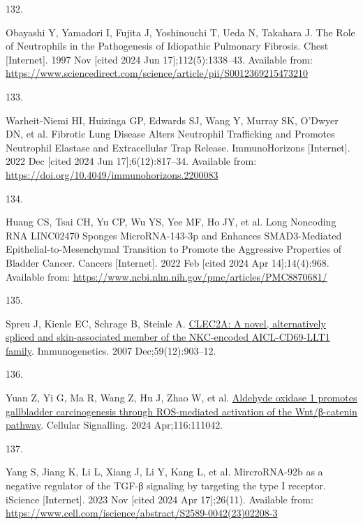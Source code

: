 \documentclass[
]{article}
\newlength{\cslhangindent}
\newlength{\csllabelwidth}
\newenvironment{CSLReferences}[2] %
 {\begin{list}{}{%
  \setlength{\itemindent}{0pt}
  \setlength{\leftmargin}{0pt}
  \setlength{\parsep}{0pt}
  \ifodd #1
   \setlength{\leftmargin}{\cslhangindent}
   \setlength{\itemindent}{-1\cslhangindent}
  \fi
  \setlength{\itemsep}{#2\baselineskip}}}
 {\end{list}}
\newcommand{\CSLLeftMargin}[1]{\parbox[t]{\csllabelwidth}{\strut#1\strut}}
\newcommand{\CSLRightInline}[1]{\parbox[t]{\linewidth - \csllabelwidth}{\strut#1\strut}}
\begin{document}
\begin{CSLReferences}{0}{1}
\CSLLeftMargin{132. }%
\CSLRightInline{Obayashi Y, Yamadori I, Fujita J, Yoshinouchi T, Ueda N, Takahara J. The {Role} of {Neutrophils} in the {Pathogenesis} of {Idiopathic} {Pulmonary} {Fibrosis}. Chest {[}Internet{]}. 1997 Nov {[}cited 2024 Jun 17{]};112(5):1338--43. Available from: \url{https://www.sciencedirect.com/science/article/pii/S0012369215473210}}

\CSLLeftMargin{133. }%
\CSLRightInline{Warheit-Niemi HI, Huizinga GP, Edwards SJ, Wang Y, Murray SK, O'Dwyer DN, et al. Fibrotic {Lung} {Disease} {Alters} {Neutrophil} {Trafficking} and {Promotes} {Neutrophil} {Elastase} and {Extracellular} {Trap} {Release}. ImmunoHorizons {[}Internet{]}. 2022 Dec {[}cited 2024 Jun 17{]};6(12):817--34. Available from: \url{https://doi.org/10.4049/immunohorizons.2200083}}

\CSLLeftMargin{134. }%
\CSLRightInline{Huang CS, Tsai CH, Yu CP, Wu YS, Yee MF, Ho JY, et al. Long {Noncoding} {RNA} {LINC02470} {Sponges} {MicroRNA}-143-3p and {Enhances} {SMAD3}-{Mediated} {Epithelial}-to-{Mesenchymal} {Transition} to {Promote} the {Aggressive} {Properties} of {Bladder} {Cancer}. Cancers {[}Internet{]}. 2022 Feb {[}cited 2024 Apr 14{]};14(4):968. Available from: \url{https://www.ncbi.nlm.nih.gov/pmc/articles/PMC8870681/}}

\CSLLeftMargin{135. }%
\CSLRightInline{Spreu J, Kienle EC, Schrage B, Steinle A. \href{https://doi.org/10.1007/s00251-007-0263-1}{{CLEC2A}: A novel, alternatively spliced and skin-associated member of the {NKC}-encoded {AICL}-{CD69}-{LLT1} family}. Immunogenetics. 2007 Dec;59(12):903--12. }

\CSLLeftMargin{136. }%
\CSLRightInline{Yuan Z, Yi G, Ma R, Wang Z, Hu J, Zhao W, et al. \href{https://doi.org/10.1016/j.cellsig.2024.111042}{Aldehyde oxidase 1 promotes gallbladder carcinogenesis through {ROS}-mediated activation of the {Wnt}/β-catenin pathway}. Cellular Signalling. 2024 Apr;116:111042. }

\CSLLeftMargin{137. }%
\CSLRightInline{Yang S, Jiang K, Li L, Xiang J, Li Y, Kang L, et al. {MircroRNA}-92b as a negative regulator of the {TGF}-β signaling by targeting the type {I} receptor. iScience {[}Internet{]}. 2023 Nov {[}cited 2024 Apr 17{]};26(11). Available from: \url{https://www.cell.com/iscience/abstract/S2589-0042(23)02208-3}}


\end{CSLReferences}
\end{document}
